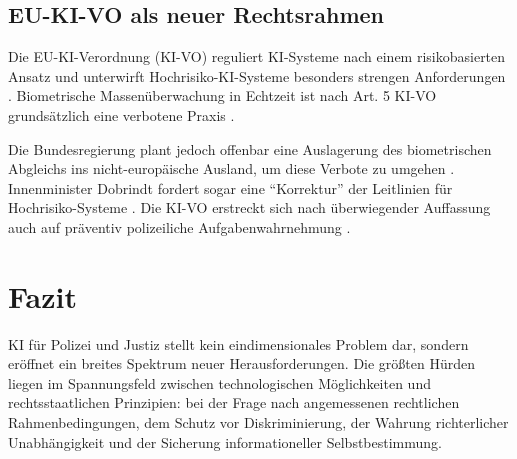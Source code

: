 \documentclass[12pt,a4paper]{article}
\begin{document}
	\subsection{EU-KI-VO als neuer Rechtsrahmen}
	
	Die EU-KI-Verordnung (KI-VO) reguliert KI-Systeme nach einem risikobasierten Ansatz und unterwirft Hochrisiko-KI-Systeme besonders strengen Anforderungen \cite{Kriminalpolizei2026}. Biometrische Massenüberwachung in Echtzeit ist nach Art. 5 KI-VO grundsätzlich eine verbotene Praxis \cite{RAV2025}.
	
	Die Bundesregierung plant jedoch offenbar eine Auslagerung des biometrischen Abgleichs ins nicht-europäische Ausland, um diese Verbote zu umgehen \cite{Gruene2026}. Innenminister Dobrindt fordert sogar eine \enquote{Korrektur} der Leitlinien für Hochrisiko-Systeme \cite{Dobrindt2026}. Die KI-VO erstreckt sich nach überwiegender Auffassung auch auf präventiv polizeiliche Aufgabenwahrnehmung \cite{Kriminalpolizei2026}.
	
	\section{Fazit}
	
	KI für Polizei und Justiz stellt kein eindimensionales Problem dar, sondern eröffnet ein breites Spektrum neuer Herausforderungen. Die größten Hürden liegen im Spannungsfeld zwischen technologischen Möglichkeiten und rechtsstaatlichen Prinzipien: bei der Frage nach angemessenen rechtlichen Rahmenbedingungen, dem Schutz vor Diskriminierung, der Wahrung richterlicher Unabhängigkeit und der Sicherung informationeller Selbstbestimmung.
	
\end{document}
